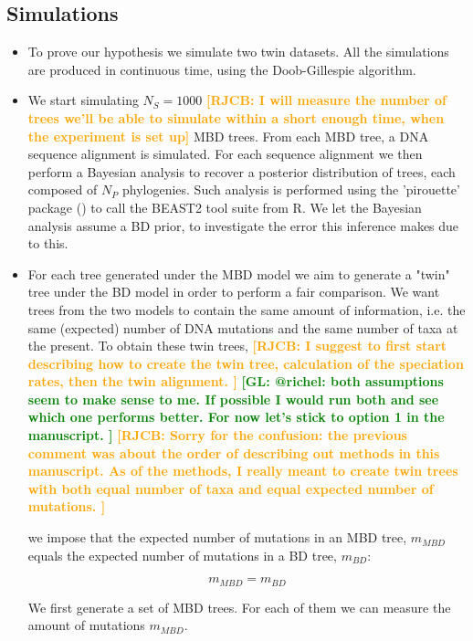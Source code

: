 \documentclass{article}
\newcommand*\richel[1]{\textcolor{orange}{\textbf{[RJCB: #1]}}}
\newcommand*\gio[1]{\textcolor{green}{\textbf{[GL: #1]}}}
\begin{document}
\subsection{Simulations}
\begin{itemize}

\item To prove our hypothesis we simulate two twin datasets. All the simulations are produced in continuous time, using the Doob-Gillespie algorithm. 

\item We start simulating $N_{S} = 1000$ \richel{I will measure the number of trees we'll be able to simulate within a short enough time, when the experiment is set up} MBD trees. From each MBD tree, a DNA sequence alignment is simulated. For each sequence alignment we then perform a Bayesian analysis to recover a posterior distribution of trees, each composed of $N_{P}$ phylogenies. Such analysis is performed using 
the 'pirouette' package (\cite{pirouette}) to call the BEAST2 tool 
suite from R. We let the Bayesian analysis assume a BD prior, to investigate
the error this inference makes due to this.

\item For each tree 
generated under the MBD model we aim to generate a "twin" tree under the BD model in order to perform a fair comparison. 
We want trees from the two models to contain the same amount of information, 
i.e. the same (expected) number of DNA mutations and 
the same number of taxa at the present.
To obtain these twin trees, 
\richel{
  I suggest to first start describing how to create the twin tree,
  calculation of the speciation rates, then the twin alignment.
}
\gio{@richel: both assumptions seem to make sense to me. 
  If possible I would run both and see which one performs better. For now
  let's stick to option 1 in the manuscript.
}
\richel{
  Sorry for the confusion: the previous comment was about the order
  of describing out methods in this manuscript. As of the methods,  
  I really meant to create twin trees with 
  both equal number of taxa and equal expected number of mutations.
}
  
we impose
that the expected number of mutations in an MBD tree, $m_{MBD}$ equals
the expected number of mutations in a BD tree, $m_{BD}$:

\begin{equation}
m_{MBD} = m_{BD} \label{m equivalence}
\end{equation} 

We first generate a set of MBD trees. For each of them we can measure the amount of mutations $m_{MBD}$.


\end{itemize}
\end{document}
